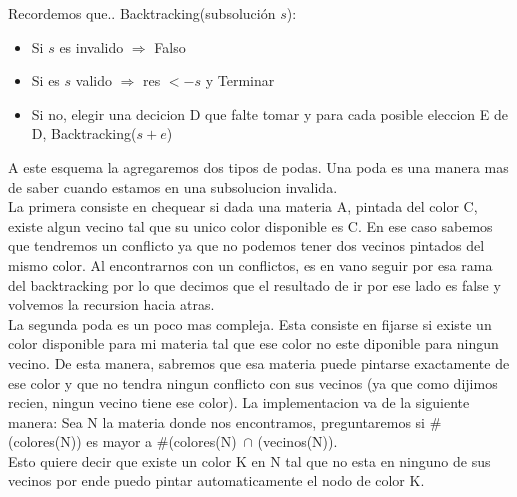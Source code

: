 Recordemos que.. Backtracking(subsoluci\'on $s$):
\begin{itemize}
\item Si $s$ es invalido $\Rightarrow$ Falso
\item Si es $s$ valido $\Rightarrow$ res $<-s$ y Terminar
\item Si no, elegir una decicion D que falte tomar y para cada posible eleccion E de D, Backtracking($s+e$)
\end{itemize}
A este esquema la agregaremos dos tipos de podas. Una poda es una manera mas de saber cuando estamos en una subsolucion invalida.\\
La primera consiste en chequear si dada una materia A, pintada del color C, existe algun vecino tal que su unico color disponible es C. En ese caso sabemos que tendremos un conflicto ya que no podemos tener dos vecinos pintados del mismo color. Al encontrarnos con un conflictos, es en vano seguir por esa rama del backtracking por lo que decimos que el resultado de ir por ese lado es false y volvemos la recursion hacia atras.\\
La segunda poda es un poco mas compleja. Esta consiste en fijarse si existe un color disponible para mi materia tal que ese color no este diponible para ningun vecino. De esta manera, sabremos que esa materia puede pintarse exactamente de ese color y que no tendra ningun conflicto con sus vecinos (ya que como dijimos recien, ningun vecino tiene ese color). La implementacion va de la siguiente manera: Sea N la materia donde nos encontramos, preguntaremos si #(colores(N)) es mayor a #(colores(N)\ $\cap$ (vecinos(N)).\\
Esto quiere decir que existe un color K en N tal que no esta en ninguno de sus vecinos por ende puedo pintar automaticamente el nodo de color K.

